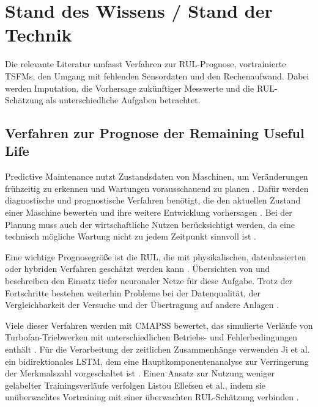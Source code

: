 \chapter{Stand des Wissens / Stand der Technik}\label{cha:relatedWork}

Die relevante Literatur umfasst Verfahren zur \ac{RUL}-Prognose, vortrainierte \acp{TSFM}, den Umgang mit fehlenden Sensordaten und den Rechenaufwand. Dabei werden Imputation, die Vorhersage zukünftiger Messwerte und die \ac{RUL}-Schätzung als unterschiedliche Aufgaben betrachtet.

\section{Verfahren zur Prognose der Remaining Useful Life}

Predictive Maintenance nutzt Zustandsdaten von Maschinen, um Veränderungen frühzeitig zu erkennen und Wartungen vorausschauend zu planen \parencite{zontaPredictiveMaintenanceIndustry2020}. Dafür werden diagnostische und prognostische Verfahren benötigt, die den aktuellen Zustand einer Maschine bewerten und ihre weitere Entwicklung vorhersagen \parencite{voglReviewDiagnosticPrognostic2016}. Bei der Planung muss auch der wirtschaftliche Nutzen berücksichtigt werden, da eine technisch mögliche Wartung nicht zu jedem Zeitpunkt sinnvoll ist \parencite{verbertTimelyConditionbasedMaintenance2017}.

Eine wichtige Prognosegröße ist die \ac{RUL}, die mit physikalischen, datenbasierten oder hybriden Verfahren geschätzt werden kann \parencite{huRemainingUsefulLife2019}. Übersichten von \textcite{berghoutSystematicGuidePredicting2022} und \textcite{wuRemainingUsefulLife2024} beschreiben den Einsatz tiefer neuronaler Netze für diese Aufgabe. Trotz der Fortschritte bestehen weiterhin Probleme bei der Datenqualität, der Vergleichbarkeit der Versuche und der Übertragung auf andere Anlagen \parencite{aminRemainingUsefulLife2026}.

Viele dieser Verfahren werden mit \ac{CMAPSS} bewertet, das simulierte Verläufe von Turbofan-Triebwerken mit unterschiedlichen Betriebs- und Fehlerbedingungen enthält \parencite{saxenaDamagePropagationModeling}. Für die Verarbeitung der zeitlichen Zusammenhänge verwenden Ji et al. ein bidirektionales \ac{LSTM}, dem eine Hauptkomponentenanalyse zur Verringerung der Merkmalszahl vorgeschaltet ist \parencite{jiRemainingUsefulLife2020}. Einen Ansatz zur Nutzung weniger gelabelter Trainingsverläufe verfolgen Listou Ellefsen et al., indem sie unüberwachtes Vortraining mit einer überwachten \ac{RUL}-Schätzung verbinden \parencite{listouellefsenRemainingUsefulLife2019}.

